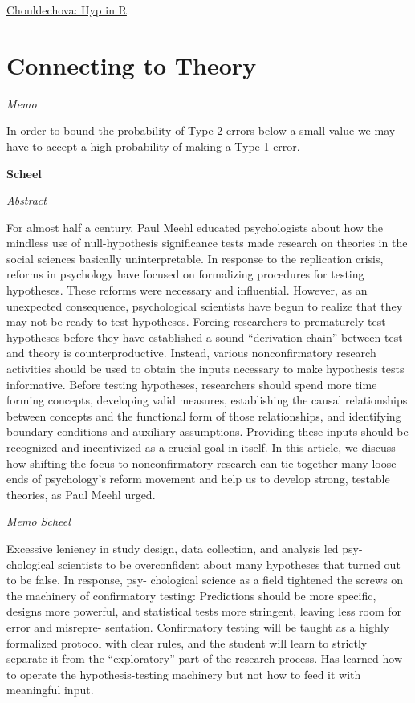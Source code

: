 \documentclass[
]{book}
\begin{document}
\href{https://www.andrew.cmu.edu/user/achoulde/94842/lectures/lecture07/lecture07-94842.html}{Chouldechova: Hyp in R}

\hypertarget{connecting-to-theory}{%
\section{Connecting to Theory}\label{connecting-to-theory}}

\emph{Memo}

In order to bound the probability of Type 2 errors below a small value
we may have to accept a high probability of making a Type 1 error.

\textbf{Scheel}

\emph{Abstract}

For almost half a century, Paul Meehl educated psychologists about how the mindless use of null-hypothesis significance
tests made research on theories in the social sciences basically uninterpretable. In response to the replication crisis,
reforms in psychology have focused on formalizing procedures for testing hypotheses. These reforms were necessary
and influential. However, as an unexpected consequence, psychological scientists have begun to realize that they
may not be ready to test hypotheses. Forcing researchers to prematurely test hypotheses before they have established
a sound ``derivation chain'' between test and theory is counterproductive. Instead, various nonconfirmatory research
activities should be used to obtain the inputs necessary to make hypothesis tests informative. Before testing hypotheses,
researchers should spend more time forming concepts, developing valid measures, establishing the causal relationships
between concepts and the functional form of those relationships, and identifying boundary conditions and auxiliary
assumptions. Providing these inputs should be recognized and incentivized as a crucial goal in itself. In this article, we
discuss how shifting the focus to nonconfirmatory research can tie together many loose ends of psychology's reform
movement and help us to develop strong, testable theories, as Paul Meehl urged.

\emph{Memo Scheel}

Excessive leniency
in study design, data collection, and analysis led psy-
chological scientists to be overconfident about many
hypotheses that turned out to be false. In response, psy-
chological science as a field tightened the screws on the
machinery of confirmatory testing: Predictions should be
more specific, designs more powerful, and statistical tests
more stringent, leaving less room for error and misrepre-
sentation. Confirmatory testing will be taught as a highly
formalized protocol with clear rules, and the student will
learn to strictly separate it from the ``exploratory'' part of
the research process. Has learned how
to operate the hypothesis-testing machinery but not
how to feed it with meaningful input.
\end{document}
